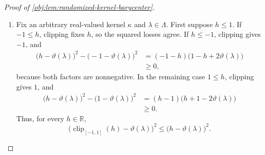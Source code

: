 \documentclass[11pt]{article}
\begin{document}
\begin{proof}[Proof of \cref{obj:lem:randomized-kernel-barycenter}]
\begin{enumerate}
The deterministic-kernel construction gives the first comparison:
\[
\inf_{\kappa\in\mathcal K_{\mathrm{bd}}}
\sup_{\lambda\in\Lambda}\mathcal R_{\mathrm{bd}}(\kappa,\lambda)
\le
\inf_{b\in\mathcal B_{\mathrm{det}}}
\sup_{\lambda\in\Lambda}\mathcal R_{\mathrm{det}}(b,\lambda).
\]
Conversely, each
\(\kappa\in\mathcal K_{\mathrm{bd}}\) has the barycenter map
\(b_\kappa\in\mathcal B_{\mathrm{det}}\), whose pointwise risk inequality gives
\[
\sup_{\lambda\in\Lambda}\mathcal R_{\mathrm{det}}(b_\kappa,\lambda)
\le
\sup_{\lambda\in\Lambda}\mathcal R_{\mathrm{bd}}(\kappa,\lambda).
\]
For a nonempty parameter set this follows from monotonicity of bounded
suprema; for an empty parameter set both sides equal zero. Taking infima gives
\[
\inf_{b\in\mathcal B_{\mathrm{det}}}
\sup_{\lambda\in\Lambda}\mathcal R_{\mathrm{det}}(b,\lambda)
\le
\inf_{\kappa\in\mathcal K_{\mathrm{bd}}}
\sup_{\lambda\in\Lambda}\mathcal R_{\mathrm{bd}}(\kappa,\lambda).
\]
The two comparisons establish the asserted equality. %

\item Fix an arbitrary real-valued kernel \(\kappa\) and
\(\lambda\in\Lambda\). First suppose \(h\le1\). If \(-1\le h\), clipping fixes
\(h\), so the squared losses agree. If \(h\le-1\), clipping gives \(-1\), and
\[
\begin{aligned}
\bigl(h-\vartheta(\lambda)\bigr)^2
-\bigl(-1-\vartheta(\lambda)\bigr)^2
&=(-1-h)\bigl(1-h+2\vartheta(\lambda)\bigr)\\
&\ge0,
\end{aligned}
\]
because both factors are nonnegative. In the remaining case \(1\le h\),
clipping gives \(1\), and
\[
\begin{aligned}
\bigl(h-\vartheta(\lambda)\bigr)^2
-\bigl(1-\vartheta(\lambda)\bigr)^2
&=(h-1)\bigl(h+1-2\vartheta(\lambda)\bigr)\\
&\ge0.
\end{aligned}
\]
Thus, for every \(h\in\mathbb R\),
\[
\bigl(\operatorname{clip}_{[-1,1]}(h)-\vartheta(\lambda)\bigr)^2
\le
\bigl(h-\vartheta(\lambda)\bigr)^2.
\]


\end{enumerate}
\end{proof}
\end{document}

